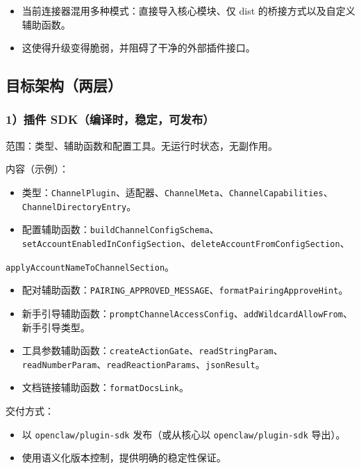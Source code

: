 \begin{itemize}
  \item 当前连接器混用多种模式：直接导入核心模块、仅 dist 的桥接方式以及自定义辅助函数。
  \item 这使得升级变得脆弱，并阻碍了干净的外部插件接口。
\end{itemize}


\subsection{目标架构（两层）}


\subsubsection{1）插件 SDK（编译时，稳定，可发布）}


范围：类型、辅助函数和配置工具。无运行时状态，无副作用。

内容（示例）：

\begin{itemize}
  \item 类型：\texttt{ChannelPlugin}、适配器、\texttt{ChannelMeta}、\texttt{ChannelCapabilities}、\texttt{ChannelDirectoryEntry}。
  \item 配置辅助函数：\texttt{buildChannelConfigSchema}、\texttt{setAccountEnabledInConfigSection}、\texttt{deleteAccountFromConfigSection}、
\end{itemize}

\texttt{applyAccountNameToChannelSection}。
\begin{itemize}
  \item 配对辅助函数：\texttt{PAIRING\_APPROVED\_MESSAGE}、\texttt{formatPairingApproveHint}。
  \item 新手引导辅助函数：\texttt{promptChannelAccessConfig}、\texttt{addWildcardAllowFrom}、新手引导类型。
  \item 工具参数辅助函数：\texttt{createActionGate}、\texttt{readStringParam}、\texttt{readNumberParam}、\texttt{readReactionParams}、\texttt{jsonResult}。
  \item 文档链接辅助函数：\texttt{formatDocsLink}。
\end{itemize}


交付方式：

\begin{itemize}
  \item 以 \texttt{openclaw/plugin-sdk} 发布（或从核心以 \texttt{openclaw/plugin-sdk} 导出）。
  \item 使用语义化版本控制，提供明确的稳定性保证。
\end{itemize}


